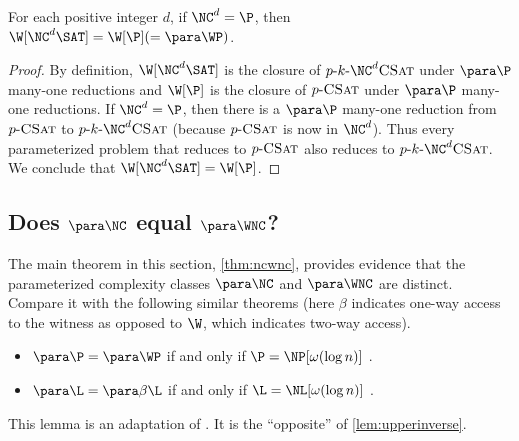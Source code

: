 \begin{corollary}
  For each positive integer $d$, if $\NC^d = \P$, then $\W[\NC^d \SAT] = \W[\P] (= \para \WP)$.
\end{corollary}
\begin{proof}
  By definition, $\W[\NC^d \SAT]$ is the closure of $\pNCSAT$ under $\para \P$ many-one reductions and $\W[\P]$ is the closure of $p \textnormal{-} \textsc{CSat}$ under $\para \P$ many-one reductions.
  If $\NC^d = \P$, then there is a $\para \P$ many-one reduction from $p \textnormal{-} \textsc{CSat}$ to $\pNCSAT$ (because $p \textnormal{-} \textsc{CSat}$ is now in $\NC^d$).
  Thus every parameterized problem that reduces to $p \textnormal{-} \textsc{CSat}$ also reduces to $\pNCSAT$.
  We conclude that $\W[\NC^d \SAT] = \W[\P]$.
\end{proof}

\subsection{Does \texorpdfstring{$\para \NC$}{paraNC} equal \texorpdfstring{$\para \WNC$}{paraWNC}?}
\label{sec:ncwnc}

The main theorem in this section, \autoref{thm:ncwnc}, provides evidence that the parameterized complexity classes $\para \NC$ and $\para \WNC$ are distinct.
Compare it with the following similar theorems (here $\beta$ indicates one-way access to the witness as opposed to $\W$, which indicates two-way access).
\begin{itemize}
\item $\para \P = \para \WP$ if and only if $\P = \NP[\omega(\log n)]$ \autocite[Theorem~3.29]{fg06}.
\item $\para \L = \para \beta \L$ if and only if $\L = \NL[\omega(\log n)]$ \autocite[Theorem~15]{cm14}.
\end{itemize}

This lemma is an adaptation of \autocite[Lemma~3.24]{fg06}.
It is the ``opposite'' of \autoref{lem:upperinverse}.

